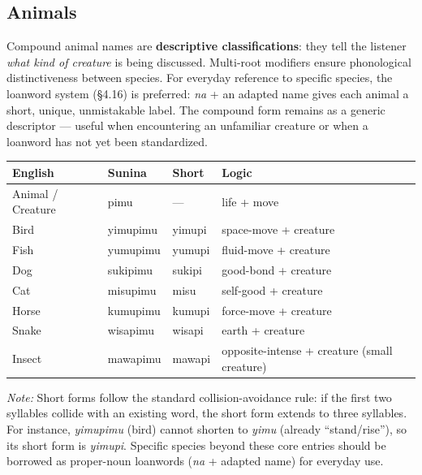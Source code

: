 \documentclass[12pt, a4paper]{article}
\begin{document}
\subsection{Animals}
Compound animal names are \textbf{descriptive classifications}: they tell the listener \textit{what kind of creature} is being discussed. Multi-root modifiers ensure phonological distinctiveness between species. For everyday reference to specific species, the loanword system (\S4.16) is preferred: \textit{na} + an adapted name gives each animal a short, unique, unmistakable label. The compound form remains as a generic descriptor --- useful when encountering an unfamiliar creature or when a loanword has not yet been standardized.

\begin{tabular}{@{}llll@{}}
\toprule
\textbf{English} & \textbf{Sunina} & \textbf{Short} & \textbf{Logic} \\ \midrule
Animal / Creature & pimu & --- & life + move \\
Bird & yimupimu & yimupi & space-move + creature \\
Fish & yumupimu & yumupi & fluid-move + creature \\
Dog & sukipimu & sukipi & good-bond + creature \\
Cat & misupimu & misu & self-good + creature \\
Horse & kumupimu & kumupi & force-move + creature \\
Snake & wisapimu & wisapi & earth + creature \\
Insect & mawapimu & mawapi & opposite-intense + creature (small creature) \\
\bottomrule
\end{tabular}

\vspace{0.3em}
\textit{Note:} Short forms follow the standard collision-avoidance rule: if the first two syllables collide with an existing word, the short form extends to three syllables. For instance, \textit{yimupimu} (bird) cannot shorten to \textit{yimu} (already ``stand/rise''), so its short form is \textit{yimupi}. Specific species beyond these core entries should be borrowed as proper-noun loanwords (\textit{na} + adapted name) for everyday use.
\end{document}
